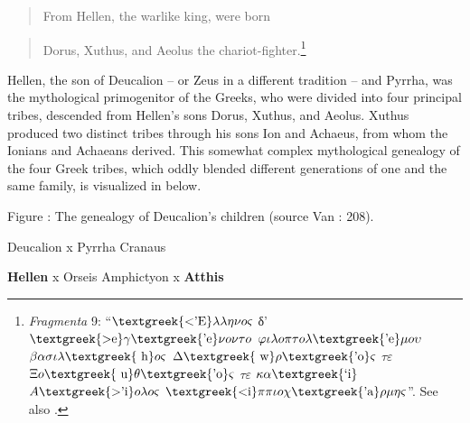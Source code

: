 \documentclass[output=paper]{langsci/langscibook}
\begin{document}
\begin{quote}
From Hellen, the warlike king, were born
\end{quote}

\begin{quote}
Dorus, Xuthus, and Aeolus the chariot-fighter.\footnote{\textit{Fragmenta} 9: “$\text{\textgreek{<'E}}\lambda \lambda \eta \nu o\varsigma $ δ’ $\text{\textgreek{>e}}\gamma \text{\textgreek{'e}}\nu o\nu \tau o$ $\varphi \iota \lambda o\pi \tau o\lambda \text{\textgreek{'e}}\mu o\upsilon $ $\beta \alpha \sigma \iota \lambda \text{\textgreek{~h}}o\varsigma $ {\textbar} $\Delta \text{\textgreek{~w}}\rho \text{\textgreek{'o}}\varsigma $ $\tau \varepsilon $ $\Xi o\text{\textgreek{~u}}\theta \text{\textgreek{'o}}\varsigma $ $\tau \varepsilon $ $\kappa \alpha \text{\textgreek{`i}}$ $A\text{\textgreek{>'i}}o\lambda o\varsigma $ $\text{\textgreek{<i}}\pi \pi \iota o\chi \text{\textgreek{'a}}\rho \mu \eta \varsigma $”. See also \citet[64]{Hainsworth1967}.}
\end{quote}

Hellen, the son of Deucalion – or Zeus in a different tradition – and Pyrrha, was the mythological primogenitor of the Greeks, who were divided into four principal tribes, descended from Hellen’s sons Dorus, Xuthus, and Aeolus. Xuthus produced two distinct tribes through his sons Ion and Achaeus, from whom the Ionians and Achaeans derived. This somewhat complex mythological genealogy of the four Greek tribes, which oddly blended different generations of one and the same family, is visualized in  below.

\begin{stylecaption}
Figure : The genealogy of Deucalion’s children (source Van \citealt{Rooy2016b}: 208).
\end{stylecaption}

Deucalion x Pyrrha        Cranaus

\begin{styleListParagraph}
  \textbf{Hellen} x Orseis  Amphictyon  x  \textbf{Atthis}
\end{styleListParagraph}

\begin{styleListParagraph}

\end{styleListParagraph}
\end{document}
